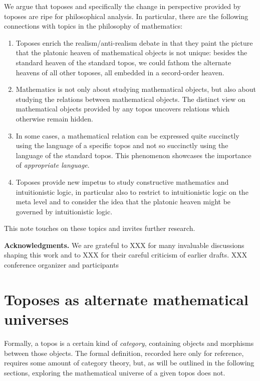 \documentclass[oneside]{amsart}
\theoremstyle{definition}
\theoremstyle{plain}
\theoremstyle{remark}
\renewcommand{\_}{\mathpunct{.}\,}
\newcommand{\?}{\,{:}\,}
\renewcommand{\paragraph}[1]{\noindent\textbf{#1.}}
\begin{document}
We argue that toposes and specifically the change in perspective provided by
toposes are ripe for philosophical analysis. In particular, there are the
following connections with topics in the philosophy of mathematics:
\begin{enumerate}
\item Toposes enrich the realism/anti-realism debate in that they paint the
picture that the platonic heaven of mathematical objects is not unique: besides
the standard heaven of the standard topos, we could fathom the alternate
heavens of all other toposes, all embedded in a secord-order heaven.
\item Mathematics is not only about studying mathematical objects, but also
about studying the relations between mathematical objects. The distinct view
on mathematical objects provided by any topos uncovers relations which
otherwise remain hidden.
\item In some cases, a mathematical relation can be expressed quite succinctly
using the language of a specific topos and not so succinctly using the language
of the standard topos. This phenomenon showcases the importance of
\emph{appropriate language}.
\item Toposes provide new impetus to study constructive mathematics and
intuitionistic logic, in particular also to restrict to intuitionistic
logic on the meta level and to consider the idea that the platonic heaven might
be governed by intuitionistic logic.
\end{enumerate}
This note touches on these topics and invites further research.

\bigskip
\paragraph{Acknowledgments} We are grateful to XXX for many invaluable
discussions shaping this work and to XXX for their careful criticism of earlier
drafts. XXX conference organizer and participants


\section{Toposes as alternate mathematical universes}

Formally, a topos is a certain kind of \emph{category}, containing objects and
morphisms between those objects. The formal definition, recorded here only for
reference, requires some amount of category theory, but, as will be outlined in
the following sections, exploring the mathematical universe of a given topos
does not.
\end{document}

